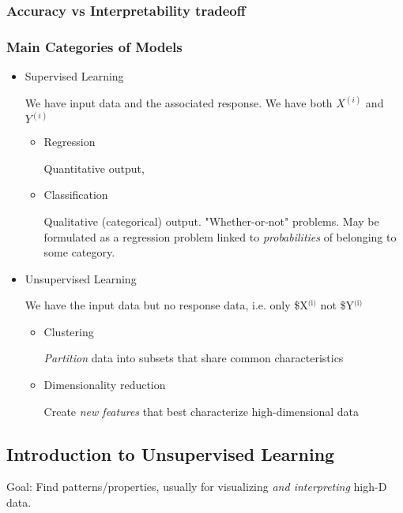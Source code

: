 \documentclass[11pt]{article}
\begin{document}
\subsubsection*{Accuracy vs Interpretability tradeoff}
\label{sec-2-1-4}

\subsubsection*{Main Categories of Models}
\label{sec-2-1-5}

\begin{itemize}
\item Supervised Learning
\label{sec-2-1-5-1}

We have input data and the associated response. We have both $X^(i)$ and $Y^(i)$
\begin{itemize}
\item Regression
\label{sec-2-1-5-1-1}

Quantitative output,
\item Classification
\label{sec-2-1-5-1-2}

Qualitative (categorical) output. "Whether-or-not" problems. May be formulated as a regression problem linked to \emph{probabilities} of belonging to some category.
\end{itemize}
\item Unsupervised Learning
\label{sec-2-1-5-2}

We have the input data but no response data, i.e. only \$X$^{\text{(i)}}$ not \$Y$^{\text{(i)}}$
\begin{itemize}
\item Clustering
\label{sec-2-1-5-2-1}

\emph{Partition} data into subsets that share common characteristics
\item Dimensionality reduction
\label{sec-2-1-5-2-2}

Create \emph{new features} that best characterize high-dimensional data
\end{itemize}
\end{itemize}


\subsection{Introduction to Unsupervised Learning}
\label{sec-2-2}

Goal: Find patterns/properties, usually for visualizing \emph{and interpreting} high-D data.
\end{document}
